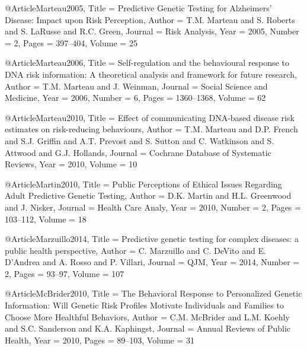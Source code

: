 @Article{Marteau2005,
  Title                    = {Predictive Genetic Testing for Alzheimers' Disease: Impact upon Risk Perception},
  Author                   = {T.M. Marteau and S. Roberts and S. LaRusse and R.C. Green},
  Journal                  = {Risk Analysis},
  Year                     = {2005},
  Number                   = {2},
  Pages                    = {397--404},
  Volume                   = {25}
}

@Article{Marteau2006,
  Title                    = {Self-regulation and the behavioural response to DNA risk information: A theoretical analysis and framework for future research},
  Author                   = {T.M. Marteau and J. Weinman},
  Journal                  = {Social Science and Medicine},
  Year                     = {2006},
  Number                   = {6},
  Pages                    = {1360--1368},
  Volume                   = {62}
}

@Article{Marteau2010,
  Title                    = {Effect of communicating DNA-based disease risk estimates on risk-reducing behaviours},
  Author                   = {T.M. Marteau and D.P. French and S.J. Griffin and A.T. Prevost and S. Sutton and C. Watkinson and S. Attwood and G.J. Hollands},
  Journal                  = {Cochrane Database of Systematic Reviews},
  Year                     = {2010},
  Volume                   = {10}
}

@Article{Martin2010,
  Title                    = {Public Perceptions of Ethical Issues Regarding Adult Predictive Genetic Testing},
  Author                   = {D.K. Martin and H.L. Greenwood and J. Nisker},
  Journal                  = {Health Care Analy},
  Year                     = {2010},
  Number                   = {2},
  Pages                    = {103--112},
  Volume                   = {18}
}

@Article{Marzuillo2014,
  Title                    = {Predictive genetic testing for complex diseases: a public health perspective},
  Author                   = {C. Marzuillo and C. DeVito and E. D'Andrea and A. Rosso and P. Villari},
  Journal                  = {QJM},
  Year                     = {2014},
  Number                   = {2},
  Pages                    = {93--97},
  Volume                   = {107}
}

@Article{McBrider2010,
  Title                    = {The Behavioral Response to Personalized Genetic Information: Will Genetic Risk Profiles Motivate Individuals and Families to Choose More Healthful Behaviors},
  Author                   = {C.M. McBrider and L.M. Koehly and S.C. Sanderson and K.A. Kaphingst},
  Journal                  = {Annual Reviews of Public Health},
  Year                     = {2010},
  Pages                    = {89--103},
  Volume                   = {31}
}

